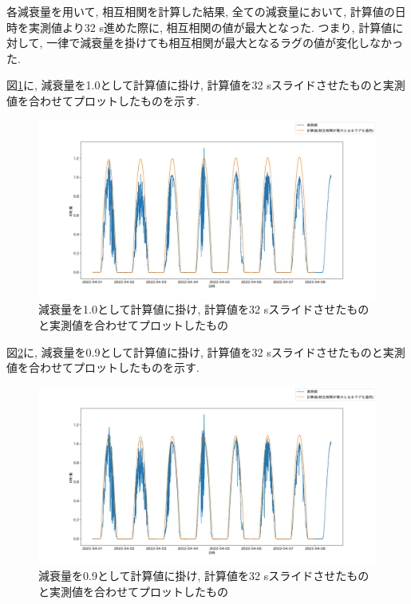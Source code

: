 \documentclass[a4j,12pt,]{jarticle}
\begin{document}
各減衰量を用いて, 相互相関を計算した結果, 全ての減衰量において, 計算値の日時を実測値より32 \si{\second}進めた際に, 相互相関の値が最大となった.
つまり, 計算値に対して, 一律で減衰量を掛けても相互相関が最大となるラグの値が変化しなかった.

図\ref{p2}に, 減衰量を1.0として計算値に掛け, 計算値を32 \si{\second}スライドさせたものと実測値を合わせてプロットしたものを示す.

\begin{figure}[H]
  \begin{center}
    \includegraphics[width=160mm]{1.0.png}
    \caption{減衰量を1.0として計算値に掛け, 計算値を32 \si{\second}スライドさせたものと実測値を合わせてプロットしたもの}
    \label{p2}
  \end{center}
\end{figure}

図\ref{p3}に, 減衰量を0.9として計算値に掛け, 計算値を32 \si{\second}スライドさせたものと実測値を合わせてプロットしたものを示す.

\begin{figure}[H]
  \begin{center}
    \includegraphics[width=160mm]{0.9.png}
    \caption{減衰量を0.9として計算値に掛け, 計算値を32 \si{\second}スライドさせたものと実測値を合わせてプロットしたもの}
    \label{p3}
  \end{center}
\end{figure}
\end{document}
